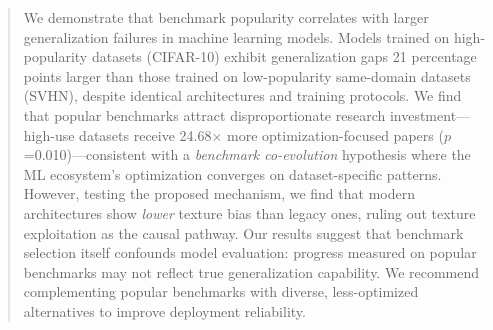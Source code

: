 \begin{abstract}
We demonstrate that benchmark popularity correlates with larger generalization failures in machine learning models. Models trained on high-popularity datasets (CIFAR-10) exhibit generalization gaps 21 percentage points larger than those trained on low-popularity same-domain datasets (SVHN), despite identical architectures and training protocols. We find that popular benchmarks attract disproportionate research investment---high-use datasets receive 24.68$\times$ more optimization-focused papers ($p$=0.010)---consistent with a \emph{benchmark co-evolution} hypothesis where the ML ecosystem's optimization converges on dataset-specific patterns. However, testing the proposed mechanism, we find that modern architectures show \emph{lower} texture bias than legacy ones, ruling out texture exploitation as the causal pathway. Our results suggest that benchmark selection itself confounds model evaluation: progress measured on popular benchmarks may not reflect true generalization capability. We recommend complementing popular benchmarks with diverse, less-optimized alternatives to improve deployment reliability.
\end{abstract}
